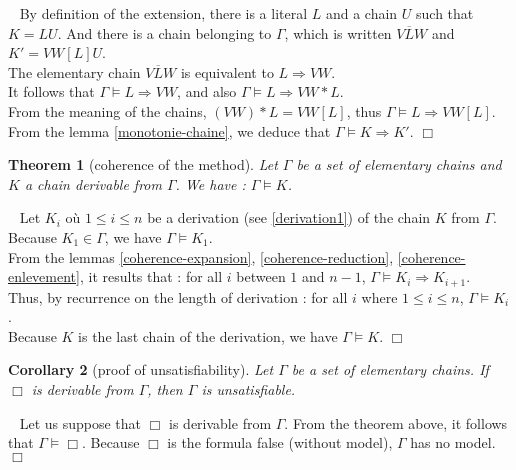 \documentclass{article}
\newtheorem{theoreme}{Theorem}\newtheorem{lemme}[theoreme]{Lemma}
\newtheorem{corollaire}[theoreme]{Corollary}
\newenvironment{preuve}{\noindent {\em Proof :}\ }{{\hfill
    $\Box$}\vspace{.5pc}} \newcommand{\sg}{\!\!<\!\!}
\begin{document}
\begin{preuve}
By definition of the extension, there is a literal $L$ and a chain $U$ such that $K = LU$.
And there is a chain belonging to $\Gamma$, which is written  $V\overline{L}W$ and  $K' = VW[L]U$.\\
The elementary chain $V\overline{L}W$ is equivalent to $L  \Rightarrow VW$.\\
It follows that $\Gamma \models L \Rightarrow VW $, and also 
$\Gamma \models  L \Rightarrow VW * L$.\\
From the meaning of the chains, $(VW) * L = VW[L]$, thus 
$\Gamma \models L \Rightarrow VW[L]$.\\ 
From the lemma \ref{monotonie-chaine}, we deduce that $\Gamma \models K \Rightarrow K'$.
\end{preuve}


\begin{theoreme}[coherence of the method]
Let $\Gamma$ be a set of elementary chains and $K$ a chain derivable from $\Gamma$.
We have : $\Gamma \models K$.
\end{theoreme}

\begin{preuve}
Let $K_i$ où $1 \leq i \leq n$ be a derivation (see \ref{derivation1}) of the chain $K$ from $\Gamma$.\\
Because $K_1 \in \Gamma$, we have $\Gamma \models K_1$.\\
From the lemmas \ref{coherence-expansion}, \ref{coherence-reduction}, \ref{coherence-enlevement}, it results that :
for all $i$ between $1$ and $n-1$, $\Gamma \models K_i \Rightarrow K_{i+1}$.\\
Thus, by recurrence on the length of derivation  :
for all $i$ where $1 \leq i \leq n$, $\Gamma \models K_i$.\\
Because $K$ is the last chain of the derivation, we have $\Gamma \models K$.
\end{preuve}

\begin{corollaire}[proof of unsatisfiability]\label{coherence-ME}
Let $\Gamma$ be a set of elementary chains. If $\Box$ is derivable from $\Gamma$, then $\Gamma$ is unsatisfiable.
\end{corollaire}

\begin{preuve}
Let us suppose that $\Box$ is derivable from $\Gamma$. From the theorem above, it follows that $\Gamma \models \Box$.
Because $\Box$ is the formula false (without model), $\Gamma$ has no model.
\end{preuve}
\end{document}
